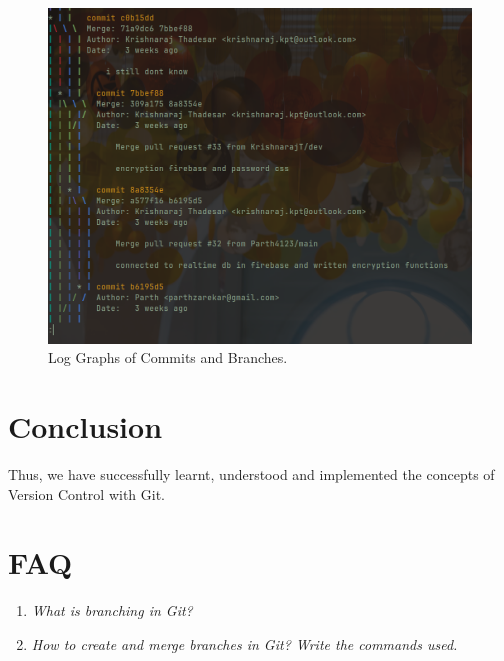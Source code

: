 \documentclass[11pt]{article}
\begin{document}
\begin{figure}[H]
    \centering
    \includegraphics[width=.85\textwidth]{3.png}
    \caption{Log Graphs of Commits and Branches.}
\end{figure}



% 

\section{Conclusion}
Thus, we have successfully learnt, understood and implemented the concepts of Version Control with Git.
\clearpage

\section{FAQ}
\begin{enumerate}
    \item \textit{What is branching in Git?}\\

    \item \textit{How to create and merge branches in Git? Write the commands used.}\\

\end{enumerate}
\end{document}
